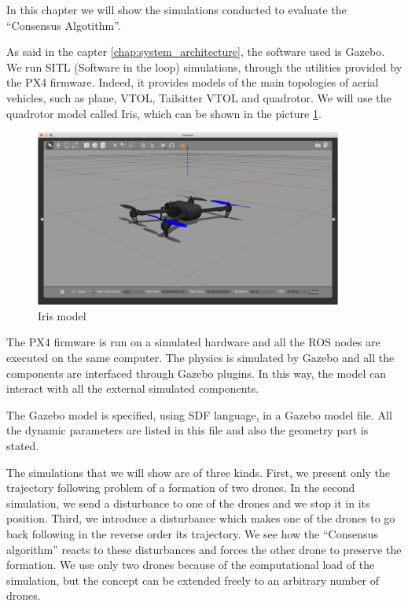In this chapter we will show the simulations conducted to evaluate the “Consensus
Algotithm”.

As said in the capter \ref{chap:system_architecture}, the software used is Gazebo.
We run SITL (Software in the loop) simulations, through the utilities provided by
the PX4 firmware. Indeed, it provides models of the main topologies of aerial vehicles,
such as plane, VTOL, Tailsitter VTOL and quadrotor.
We will use the quadrotor model called Iris, which can be shown in the picture \ref{fig:iris_model}.

\begin{figure}
\centering
\includegraphics[width=0.9\textwidth]{chapters/chapter-04/figures/iris_model.png}
\caption{Iris model}
\label{fig:iris_model}
\end{figure}

The PX4 firmware is run on a simulated hardware and all the ROS nodes are executed
on the same computer. The physics is simulated by Gazebo and all the components
are interfaced through Gazebo plugins. In this way, the model can interact with
all the external simulated components.

The Gazebo model is specified, using SDF language, in a Gazebo model file.
All the dynamic parameters are listed in this file and also the geometry part
is stated.

The simulations that we will show are of three kinds. First, we present only
the trajectory following problem of a formation of two drones.
In the second simulation, we send a disturbance to one of the drones and we stop it
in its position. Third, we introduce a disturbance which makes one of the drones to
go back following in the reverse order its trajectory.
We see how the “Consensus algorithm” reacts to these disturbances and forces the other
drone to preserve the formation.
We use only two drones because of the computational load of the simulation, but the
concept can be extended freely to an arbitrary number of drones.

